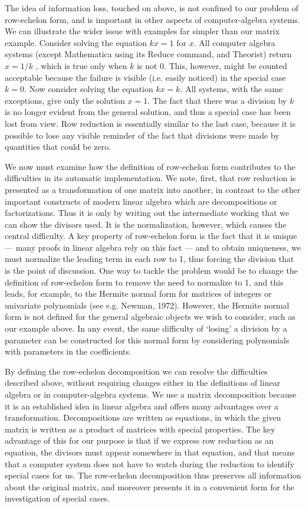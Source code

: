 The idea of information loss, touched on above, is not
confined to our
problem of row-echelon form, and is important in other
aspects of
computer-algebra systems.
We can illustrate the wider issue with examples far simpler
than our matrix example.
Consider solving the equation $kx = 1$ for $x$.  All
computer algebra systems (except Mathematica using its
Reduce
command,
and Theorist) return $x = 1/k$ ,
which is true only when $k$ is not 0.
This, however, might be counted acceptable because the
failure is
visible (i.e.  easily noticed) in the special case $k=0$.
Now consider solving
the equation $kx = k$.
All systems, with the same exceptions, give only the
solution $x = 1$.
The fact that there was a division by $k$ is no longer
evident
from the general solution, and thus a special case has been
lost from view.
Row reduction is essentially similar to the last case,
because it is possible
to lose any visible reminder of the fact that divisions were
made by
quantities that could be zero.

We now must examine how the definition of row-echelon
form
contributes to
the difficulties in its automatic implementation.
We note, first, that row reduction is presented as a
transformation of one matrix into another,
in contrast to the other important constructs of modern
linear
algebra which are decompositions or factorizations.
Thus it is only by writing out the
intermediate working that we can show the divisors used.
It is the normalization, however, which causes the central
difficulty.
A key property of row-echelon form is the fact that it is
unique
--- many proofs in linear algebra rely on
this fact --- and to obtain uniqueness,
we must normalize the leading term in
each row to 1, thus forcing the division that is the point of
discussion.
One way to tackle the problem would be to change the
definition of
row-echelon form to remove the need to normalize to 1, and
this leads, for example, to the
Hermite normal form
for matrices of integers or univariate polynomials
(see e.g. Newman, 1972).
However,
the Hermite normal form
is not
defined for the general algebraic objects we wish to
consider, such as our example above.
In any event, the same difficulty of `losing' a division by a
parameter can be constructed for this normal form
by considering polynomials with parameters in the coefficients.

By defining
the row-echelon decomposition
we can resolve the difficulties
described above, without requiring changes
either in the definitions of linear algebra or
in computer-algebra systems.
We use a matrix decomposition because it is an established
idea
in linear algebra and offers many advantages over a
transformation.
Decompositions are written as equations,
in which the given matrix is written
as a product of matrices with special properties.
The key advantage of this
for our purpose is that if we express row reduction as an
equation, the
divisors must appear somewhere in that equation, and that
means that a
computer system does not have to watch during the
reduction
to
identify special cases for us.
The row-echelon decomposition thus
preserves all information about the original
matrix, and moreover
presents it in a convenient form for the investigation of
special cases.

